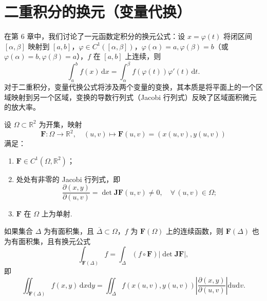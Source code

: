 \section{二重积分的换元（变量代换）}\label{sec:10.4}

在第 6 章中，我们讨论了一元函数定积分的换元公式：设 $x = \varphi(t)$ 将闭区间 $[\alpha, \beta]$ 映射到 $[a, b]$，$\varphi \in C^1([\alpha, \beta])$，$\varphi(\alpha)=a, \varphi(\beta)=b$（或 $\varphi(\alpha)=b, \varphi(\beta)=a$），$f$ 在 $[a, b]$ 上连续，则
\[
\int_a^b f(x)\,\mathrm{d}x = \int_\alpha^\beta f(\varphi(t)) \varphi'(t)\,\mathrm{d}t.
\]
对于二重积分，变量代换公式将涉及两个变量的变换，其本质是将平面上的一个区域映射到另一个区域，变换的导数行列式（Jacobi 行列式）反映了区域面积微元的放大率。

\begin{theorem}[二重积分的换元公式]\label{thm:10.4.1}
设 $\Omega \subset \mathbb{R}^2$ 为开集，映射
\[
\boldsymbol{F}\colon \Omega \to \mathbb{R}^2,\quad (u, v) \mapsto \boldsymbol{F}(u, v) = (x(u, v), y(u, v))
\]
满足：
\begin{enumerate}
  \item[$(1^\circ)$] $\boldsymbol{F} \in C^1(\Omega, \mathbb{R}^2)$；
  \item[$(2^\circ)$] 处处有非零的 Jacobi 行列式，即
  \[
  \frac{\partial(x, y)}{\partial(u, v)} = \det \boldsymbol{J}\boldsymbol{F}(u, v) \neq 0,\quad \forall\, (u, v) \in \Omega;
  \]
  \item[$(3^\circ)$] $\boldsymbol{F}$ 在 $\Omega$ 上为单射.
\end{enumerate}
如果集合 $\Delta$ 为有面积集，且 $\overline{\Delta} \subset \Omega$，$f$ 为 $\boldsymbol{F}(\Omega)$ 上的连续函数，则 $\boldsymbol{F}(\Delta)$ 也为有面积集，且有换元公式
\[
\int_{\boldsymbol{F}(\Delta)} f = \int_\Delta (f \circ \boldsymbol{F}) \left|\det \boldsymbol{J}\boldsymbol{F}\right|,
\]
即
\[
\iint_{\boldsymbol{F}(\Delta)} f(x, y)\,\mathrm{d}x\mathrm{d}y = \iint_\Delta f(x(u, v), y(u, v)) \left|\frac{\partial(x, y)}{\partial(u, v)}\right|\mathrm{d}u\mathrm{d}v.
\]
\end{theorem}

